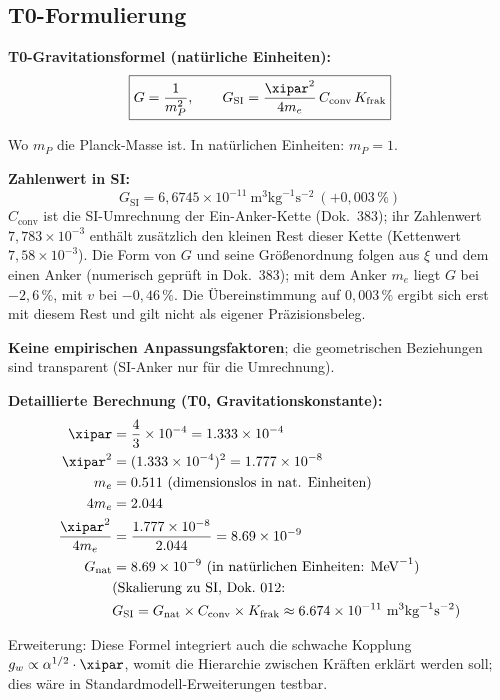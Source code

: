 	\subsection{T0-Formulierung}
	
	\begin{vorteil}
		\textbf{T0-Gravitationsformel (natürliche Einheiten):}
		\begin{equation}
			\boxed{G = \frac{1}{m_P^2}, \qquad G_{\text{SI}} = \frac{\xipar^2}{4m_e}\,C_{\text{conv}}\,K_{\text{frak}}}
		\end{equation}
		
		Wo $m_P$ die Planck-Masse ist. In natürlichen Einheiten: $m_P = 1$.
		
		\textbf{Zahlenwert in SI:}
		\begin{equation}
			\boxed{G_{\text{SI}} = 6{,}6745 \times 10^{-11}\ \text{m}^3\text{kg}^{-1}\text{s}^{-2}\ (+0{,}003\,\%)}
		\end{equation}
		$C_{\text{conv}}$ ist die SI-Umrechnung der Ein-Anker-Kette (Dok.~383); ihr Zahlenwert $7{,}783\times10^{-3}$ enthält zusätzlich den kleinen Rest dieser Kette (Kettenwert $7{,}58\times10^{-3}$). Die Form von $G$ und seine Größenordnung folgen aus $\xi$ und dem einen Anker (numerisch geprüft in Dok.~383); mit dem Anker $m_e$ liegt $G$ bei $-2{,}6\,\%$, mit $v$ bei $-0{,}46\,\%$. Die Übereinstimmung auf $0{,}003\,\%$ ergibt sich erst mit diesem Rest und gilt nicht als eigener Präzisionsbeleg.
		
		\textbf{Keine empirischen Anpassungsfaktoren}; die geometrischen Beziehungen sind transparent (SI-Anker nur für die Umrechnung).
		
		\textbf{Detaillierte Berechnung (T0, Gravitationskonstante):}
		\begin{align}
			\xipar &= \frac{4}{3} \times 10^{-4} = 1.333 \times 10^{-4} \\
			\xipar^2 &= (1.333 \times 10^{-4})^2 = 1.777 \times 10^{-8} \\
			m_e &= 0.511 \text{ (dimensionslos in nat. Einheiten)} \\
			4 m_e &= 2.044 \\
			\frac{\xipar^2}{4 m_e} &= \frac{1.777 \times 10^{-8}}{2.044} = 8.69 \times 10^{-9} \\
			G_{\text{nat}} &= 8.69 \times 10^{-9} \text{ (in natürlichen Einheiten: MeV}^{-1}\text{)} \\
			&\text{(Skalierung zu SI, Dok.~012: } \\ 
			&G_{\text{SI}} = G_{\text{nat}} \times C_{\text{conv}} \times K_{\text{frak}} \approx 6.674 \times 10^{-11} \text{ m}^3 \text{kg}^{-1} \text{s}^{-2}\text{)}
		\end{align}
		
		Erweiterung: Diese Formel integriert auch die schwache Kopplung $g_w \propto \alpha^{1/2} \cdot \xipar$, womit die Hierarchie zwischen Kräften erklärt werden soll; dies wäre in Standardmodell-Erweiterungen testbar.
	\end{vorteil}
	
